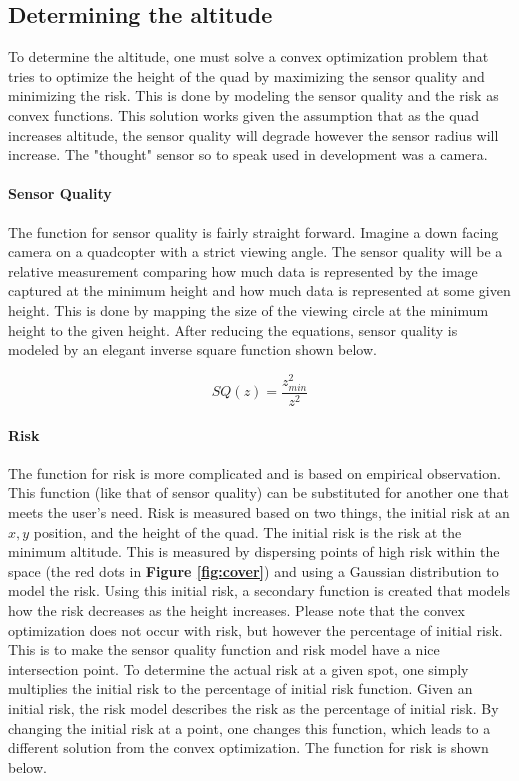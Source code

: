 \documentclass[12pt]{article}
\newcommand{\fig}[1]{\textbf{Figure \ref{fig:#1}}}
\begin{document}
\subsection{Determining the altitude}

To determine the altitude, one must solve a convex optimization problem that
tries to optimize the height of the quad by maximizing the sensor quality and
minimizing the risk. This is done by modeling the sensor quality and the risk
as convex functions. This solution works given the assumption that as the quad
increases altitude, the sensor quality will degrade however the sensor radius
will increase. The "thought" sensor so to speak used in development was a
camera.

\paragraph{Sensor Quality} The function for sensor quality is fairly straight
forward.  Imagine a down facing camera on a quadcopter with a strict viewing
angle. The sensor quality will be a relative measurement comparing how much
data is represented by the image captured at the minimum height and how much
data is represented at some given height. This is done by mapping the size of
the viewing circle at the minimum height to the given height. After reducing
the equations, sensor quality is modeled by an elegant inverse square function
shown below.

$$ SQ(z) = \frac{z_{min} ^ 2}{z ^ 2} $$

\paragraph{Risk} The function for risk is more complicated and is based on
empirical observation. This function (like that of sensor quality) can be
substituted for another one that meets the user's need. Risk is measured based
on two things, the initial risk at an $x, y$ position, and the height of the
quad. The initial risk is the risk at the minimum altitude. This is measured by
dispersing points of high risk within the space (the red dots in \fig{cover})
and using a Gaussian distribution to model the risk. Using this initial risk, a
secondary function is created that models how the risk decreases as the height
increases. Please note that the convex optimization does not occur with risk,
but however the percentage of initial risk. This is to make the sensor quality
function and risk model have a nice intersection point. To determine the actual
risk at a given spot, one simply multiplies the initial risk to the percentage
of initial risk function. Given an initial risk, the risk model describes the
risk as the percentage of initial risk. By changing the initial risk at a
point, one changes this function, which leads to a different solution from the
convex optimization. The function for risk is shown below.
\end{document}
